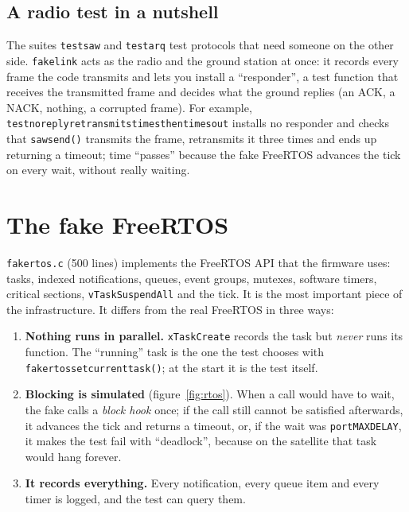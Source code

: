 \documentclass[11pt,a4paper]{article}
\DeclareRobustCommand{\_}{\textunderscore\allowbreak}
\newcommand{\cd}[1]{\texttt{#1}}
\begin{document}
\subsection{A radio test in a nutshell}

The suites \cd{test\_saw} and \cd{test\_arq} test protocols that need someone on the other
side. \cd{fake\_link} acts as the radio and the ground station at once: it records every frame the
code transmits and lets you install a ``responder'', a test function that receives the
transmitted frame and decides what the ground replies (an ACK, a NACK, nothing, a corrupted frame).
For example, \cd{test\_no\_reply\_retransmits\_3\_times\_then\_times\_out} installs no
responder and checks that \cd{saw\_send()} transmits the frame, retransmits it three times and
ends up returning a timeout; time ``passes'' because the fake FreeRTOS advances the tick on every
wait, without really waiting.

\clearpage
\section{The fake FreeRTOS}\label{sec:rtos}

\cd{fake\_rtos.c} (500 lines) implements the FreeRTOS API that the firmware uses:
tasks, indexed notifications, queues, event groups, mutexes, software
timers, critical sections, \cd{vTaskSuspendAll} and the tick. It is the most important piece
of the infrastructure. It differs from the real FreeRTOS in three ways:

\begin{enumerate}
\item \textbf{Nothing runs in parallel.} \cd{xTaskCreate} records the task but
  \emph{never} runs its function. The ``running'' task is the one the test chooses with
  \cd{fake\_rtos\_set\_current\_task()}; at the start it is the test itself.
\item \textbf{Blocking is simulated} (figure~\ref{fig:rtos}). When a call would have
  to wait, the fake calls a \emph{block hook} once; if the call still cannot be
  satisfied afterwards, it advances the tick and returns a timeout, or, if the wait was \cd{portMAX\_DELAY}, it makes
  the test fail with ``deadlock'', because on the satellite that task would hang
  forever.
\item \textbf{It records everything.} Every notification, every queue item and every timer is
  logged, and the test can query them.
\end{enumerate}
\end{document}
